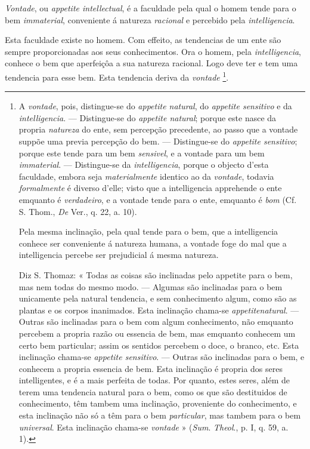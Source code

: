 
  
\emph{Vontade}, ou \emph{appetite intellectual}, é a faculdade pela qual o homem tende para o bem \emph{immaterial}, conveniente á natureza \emph{racional} e percebido pela \emph{intelligencia}.

Esta faculdade existe no homem. Com effeito, as tendencias de um ente são sempre proporcionadas aos seus conhecimentos. Ora o homem, pela \emph{intelligencia}, conhece o bem que aperfeiçôa a sua natureza racional. Logo deve ter e tem uma tendencia para esse bem. Esta tendencia deriva da \emph{vontade} \footnote{A \emph{vontade}, pois, distingue-se do \emph{appetite natural}, do \emph{appetite sensitivo} e da \emph{intelligencia}. --- Distingue-se do \emph{appetite natural}; porque este nasce da propria \emph{natureza} do ente, sem percepção precedente, ao passo que a vontade suppõe uma previa percepção do bem. --- Distingue-se do \emph{appetite sensitivo}; porque este tende para um bem \emph{sensivel}, e a vontade para um bem \emph{immaterial}. --- Distingue-se da \emph{intelligencia}, porque o objecto d'esta faculdade, embora seja \emph{materialmente} identico ao da \emph{vontade}, todavia \emph{formalmente} é diverso d'elle; visto que a intelligencia apprehende o ente emquanto é \emph{verdadeiro}, e a vontade tende para o ente, emquanto é \emph{bom} (Cf. S. Thom., \emph{De} Ver., q. 22, a. 10).\par Pela mesma inclinação, pela qual tende para o bem, que a intelligencia conhece ser conveniente á natureza humana, a vontade foge do mal que a intelligencia percebe ser prejudicial á mesma natureza.\par Diz S. Thomaz: « Todas as coisas são inclinadas pelo appetite para o bem, mas nem todas do mesmo modo. --- Algumas são inclinadas para o bem unicamente pela natural tendencia, e sem conhecimento algum, como são as plantas e os corpos inanimados. Esta inclinação chama-se \emph{appetite}\emph{natural}. --- Outras são inclinadas para o bem com algum conhecimento, não emquanto percebem a propria razão ou essencia de bem, mas emquanto conhecem um certo bem particular; assim os sentidos percebem o doce, o branco, etc. Esta inclinação chama-se \emph{appetite sensitivo}. --- Outras são inclinadas para o bem, e conhecem a propria essencia de bem. Esta inclinação é propria dos seres intelligentes, e é a mais perfeita de todas. Por quanto, estes seres, além de terem uma tendencia natural para o bem, como os que são destituidos de conhecimento, têm tambem uma inclinação, proveniente do conhecimento, e esta inclinação não só a têm para o bem \emph{particular}, mas tambem para o bem \emph{universal}. Esta inclinação chama-se \emph{vontade} » (\emph{Sum}. \emph{Theol}., p. I, q. 59, a. 1).}.

